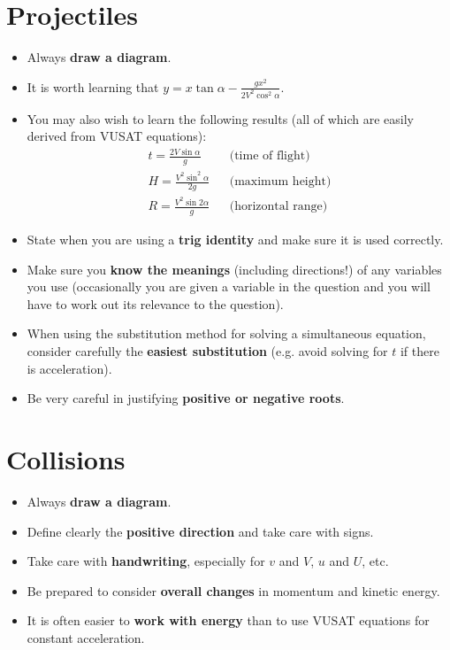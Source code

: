 \documentclass[9pt]{extarticle}
\begin{document}
	\section{Projectiles}
	
	\begin{itemize}
		\item Always \textbf{draw a diagram}.
		\item It is worth learning that $\boxed{y = x\tan\alpha - \frac{gx^2}{2V^2\cos^2\alpha}}$.
		\item You may also wish to learn the following results (all of which are easily derived from VUSAT equations):
		\begin{align*}
		t = \frac{2V\sin\alpha}{g} && \text{(time of flight)} \\
		H = \frac{V^2\sin^2\alpha}{2g} && \text{(maximum height)} \\
		R = \frac{V^2\sin 2\alpha}{g} && \text{(horizontal range)}
		\end{align*}
		\item State when you are using a \textbf{trig identity} and make sure it is used correctly.
		\item Make sure you \textbf{know the meanings} (including directions!) of any variables you use (occasionally you are given a variable in the question and you will have to work out its relevance to the question).
		\item When using the substitution method for solving a simultaneous equation, consider carefully the \textbf{easiest substitution} (e.g. avoid solving for $t$ if there is acceleration).
		\item Be very careful in justifying \textbf{positive or negative roots}.
	\end{itemize}
	
	\section{Collisions}
	
	\begin{itemize}
		\item Always \textbf{draw a diagram}.
		\item Define clearly the \textbf{positive direction} and take care with signs.
		\item Take care with \textbf{handwriting}, especially for $v$ and $V$, $u$ and $U$, etc.
		\item Be prepared to consider \textbf{overall changes} in momentum and kinetic energy.
		\item It is often easier to \textbf{work with energy} than to use VUSAT equations for constant acceleration.
	\end{itemize}
	
\end{document}

